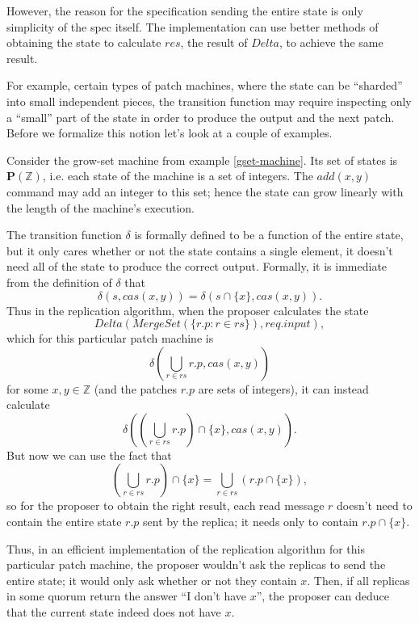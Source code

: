 \documentclass[12pt,a4paper,en]{pracamgr}
\newcommand{\mbb}[1]{\mathbb{#1}}
\newcommand{\mbf}[1]{\mathbf{#1}}
\begin{document}
However, the reason for the specification sending the entire state is only simplicity of the spec itself. The implementation can use better methods of obtaining the state to calculate $res$, the result of $Delta$, to achieve the same result.

For example, certain types of patch machines, where the state can be ``sharded'' into small independent pieces, the transition function may require inspecting only a ``small'' part of the state in order to produce the output and the next patch. Before we formalize this notion let's look at a couple of examples.

\begin{ex}\label{gset-opt-read}
    Consider the grow-set machine from example \ref{gset-machine}. Its set of states is $\mbf P(\mbb Z)$, i.e. each state of the machine is a set of integers. The $add(x, y)$ command may add an integer to this set; hence the state can grow linearly with the length of the machine's execution.

    The transition function $\delta$ is formally defined to be a function of the entire state, but it only cares whether or not the state contains a single element, it doesn't need all of the state to produce the correct output. Formally, it is immediate from the definition of $\delta$ that
    $$ \delta(s, cas(x, y)) = \delta(s \cap \{x\}, cas(x, y)). $$
    Thus in the replication algorithm, when the proposer calculates the state
    $$ Delta(MergeSet(\{r.p: r \in rs\}), req.input), $$
    which for this particular patch machine is
    $$ \delta(\bigcup_{r \in rs} r.p, cas(x, y)) $$
    for some $x, y \in \mbb Z$ (and the patches $r.p$ are sets of integers), it can instead calculate
    $$ \delta((\bigcup_{r \in rs} r.p) \cap \{x\}, cas(x, y)). $$
    But now we can use the fact that
    $$ (\bigcup_{r \in rs} r.p) \cap \{x\} = \bigcup_{r \in rs} (r.p \cap \{x\}), $$
    so for the proposer to obtain the right result, each read message $r$ doesn't need to contain the entire state $r.p$ sent by the replica; it needs only to contain $r.p \cap \{x\}$.

    Thus, in an efficient implementation of the replication algorithm for this particular patch machine, the proposer wouldn't ask the replicas to send the entire state; it would only ask whether or not they contain $x$. Then, if all replicas in some quorum return the answer ``I don't have $x$'', the proposer can deduce that the current state indeed does not have $x$.
\end{ex}
\end{document}
